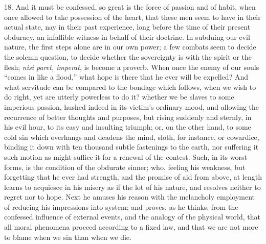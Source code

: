 18. And it must be confessed, so great is the force of passion and
of habit, when once allowed to take possession of the heart, that
these men seem to have in their actual state, nay in their past
experience, long before the time of their present obduracy, an
infallible witness in behalf of their doctrine. In subduing our evil
nature, the first steps alone are in our own power; a few combats seem
to decide the solemn question, to decide whether the sovereignty is
with the spirit or the flesh; \emph{nisi paret, imperat}, is become a
proverb. When once the enemy of our souls ``comes in like a
flood,'' what hope is there that he ever will be expelled? And
what servitude can be compared to the bondage which follows, when we
wish to do right, yet are utterly powerless to do it? whether we be
slaves to some imperious passion, hushed indeed in its victim's
ordinary mood, and allowing the recurrence of better thoughts and
purposes, but rising suddenly and sternly, in his evil hour, to its
easy and insulting triumph; or, on the other hand, to some cold sin
which overhangs and deadens the mind, sloth, for instance, or
cowardice, binding it down with ten thousand subtle fastenings to the
earth, nor suffering it such motion as might suffice it for a renewal
of the contest. Such, in its worst forms, is the condition of the
obdurate sinner; who, feeling his weakness, but forgetting that he
ever had strength, and the promise of aid from above, at length learns
to acquiesce in his misery as if the lot of his nature, and resolves
neither to regret nor to hope. Next he amuses his reason with the
melancholy employment of reducing his impressions into system; and
proves, as he thinks, from the confessed influence of external events,
and the analogy of the physical world, that all moral phenomena
proceed according to a fixed law, and that we are not more to blame
when we sin than when we die.

